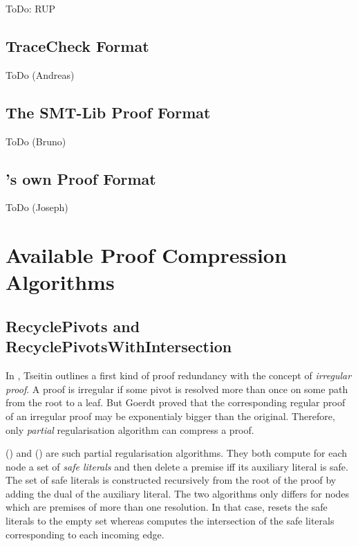 \documentclass{llncs}
\begin{document}
ToDo: RUP

\subsection{TraceCheck Format}

ToDo (Andreas)

\subsection{The SMT-Lib Proof Format}

{\veriT}

ToDo (Bruno)

\subsection{{\skeptik}'s own Proof Format}

ToDo (Joseph)


\section{Available Proof Compression Algorithms}

\subsection{RecyclePivots and RecyclePivotsWithIntersection}

In \cite{Tseitin}, Tseitin outlines a first kind of proof redundancy with the concept of
\emph{irregular proof}. A proof is irregular if some pivot is resolved more than once on some path
from the root to a leaf. But Goerdt \cite{Goerdt} proved that the corresponding regular proof of an
irregular proof may be exponentialy bigger than the original. Therefore, only \emph{partial}
regularisation algorithm can compress a proof.

 () \cite{RP08,RP11} and 
() \cite{LURPI} are such partial regularisation algorithms. They both compute for each
node a set of \emph{safe literals} and then delete a premise iff its auxiliary literal is safe. The
set of safe literals is constructed recursively from the root of the proof by adding the dual of the
auxiliary literal. The two algorithms only differs for nodes which are premises of more than one
resolution. In that case,  resets the safe literals to the empty set whereas 
computes the intersection of the safe literals corresponding to each incoming edge.
\end{document}

